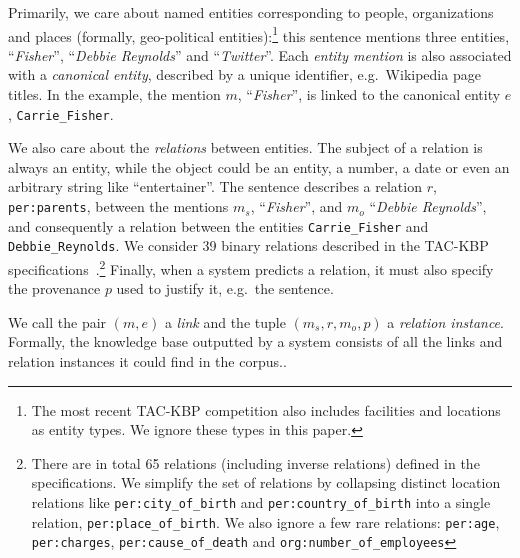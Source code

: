 Primarily, we care about named entities corresponding to people, organizations and places (formally, geo-political entities):\footnote{%
  The most recent TAC-KBP competition also includes facilities and locations as entity types. We ignore these types in this paper.}
this sentence mentions three entities,
  ``\textit{Fisher}'',
  ``\textit{Debbie Reynolds}'' and
  ``\textit{Twitter}''.
  Each \textit{entity mention} is also associated with a \textit{canonical entity}, described by a unique identifier, e.g.\ Wikipedia page titles. %
In the example, the mention $m$, ``\textit{Fisher}'', is linked to the canonical entity $e$, \texttt{Carrie\_Fisher}.

We also care about the \textit{relations} between entities.
The subject of a relation is always an entity, while the object
could be an entity, a number, a date or even an arbitrary string like ``entertainer''. 
The sentence describes a relation $r$, \texttt{per:parents}, between the mentions $m_s$, ``\textit{Fisher}'', and $m_o$ ``\textit{Debbie Reynolds}'', and consequently a relation between the entities \texttt{Carrie\_Fisher} and \texttt{Debbie\_Reynolds}.
We consider 39 binary relations described in the TAC-KBP specifications~\citep{ellis2015tackbp}.\footnote{%
  There are in total 65 relations (including inverse relations) defined in the specifications.
  We simplify the set of relations by collapsing distinct location relations like \texttt{per:city\_of\_birth} and \texttt{per:country\_of\_birth} into a single relation, \texttt{per:place\_of\_birth}.
  We also ignore a few rare relations: \texttt{per:age}, \texttt{per:charges}, \texttt{per:cause\_of\_death} and \texttt{org:number\_of\_employees}}
Finally, when a system predicts a relation, it must also specify the provenance $p$ used to justify it, e.g.\ the sentence.

We call the pair $(m, e)$ a \textit{link} and the tuple $(m_s, r, m_o, p)$ a \textit{relation instance}.
Formally, the knowledge base outputted by a system consists of all the links and relation instances it could find in the corpus..


